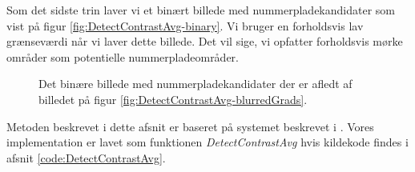 Som det sidste trin laver vi et binært billede med nummerpladekandidater som vist på figur \vref{fig:DetectContrastAvg-binary}. Vi bruger en forholdsvis lav grænseværdi når vi laver dette billede. Det vil sige, vi opfatter forholdsvis mørke områder som potentielle nummerpladeområder.

\begin{figure}[htp]
  \centering
  \caption{Det binære billede med nummerpladekandidater der er afledt af billedet på figur \vref{fig:DetectContrastAvg-blurredGrads}.}
  \label{fig:DetectContrastAvg-binary}
\end{figure}

Metoden beskrevet i dette afsnit er baseret på systemet beskrevet i \cite{shapiro}. Vores implementation er lavet som funktionen \textit{DetectContrastAvg} hvis kildekode findes i afsnit \vref{code:DetectContrastAvg}.

